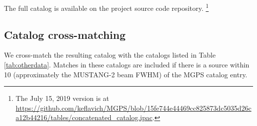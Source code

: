 \documentclass[twocolumn]{aastex62}
\newcommand{\MUSTANG}{MUSTANG-2\xspace}
\begin{document}
The full catalog is available on the project source code repository.
\footnote{The July 15, 2019 version is at
\url{https://github.com/keflavich/MGPS/blob/15fe744e44469cc825873dc5035d26ca12b44216/tables/concatenated_catalog.ipac}.}


\subsection{Catalog cross-matching}
\label{sec:catalogmatching}
We cross-match the resulting catalog with the catalogs listed in Table \ref{tab:otherdata}.  
Matches in these catalogs are included if there is a source within 10\arcsec
(approximately the \MUSTANG beam FWHM) of the MGPS catalog entry.
\end{document}

